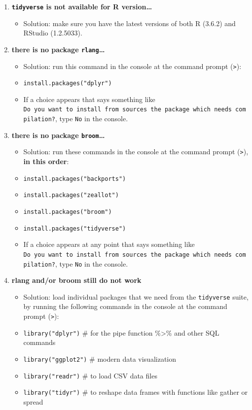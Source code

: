 \documentclass[
]{book}
\providecommand{\tightlist}{%
  \setlength{\itemsep}{0pt}\setlength{\parskip}{0pt}}
\begin{document}
\begin{enumerate}
\def\labelenumi{\arabic{enumi}.}
\tightlist
\item
  \textbf{\texttt{tidyverse} is not available for R version\ldots{}}

  \begin{itemize}
  \tightlist
  \item
    Solution: make sure you have the latest versions of both R (3.6.2) and RStudio (1.2.5033).
  \end{itemize}
\item
  \textbf{there is no package \texttt{rlang}\ldots{}}

  \begin{itemize}
  \tightlist
  \item
    Solution: run this command in the console at the command prompt (\texttt{\textgreater{}}):
  \item
    \texttt{install.packages("dplyr")}
  \item
    If a choice appears that says something like \texttt{Do\ you\ want\ to\ install\ from\ sources\ the\ package\ which\ needs\ compilation?}, type \texttt{No} in the console.
  \end{itemize}
\item
  \textbf{there is no package \texttt{broom}\ldots{}}

  \begin{itemize}
  \tightlist
  \item
    Solution: run these commands in the console at the command prompt (\texttt{\textgreater{}}), \textbf{in this order}:
  \item
    \texttt{install.packages("backports")}
  \item
    \texttt{install.packages("zeallot")}
  \item
    \texttt{install.packages("broom")}
  \item
    \texttt{install.packages("tidyverse")}
  \item
    If a choice appears at any point that says something like \texttt{Do\ you\ want\ to\ install\ from\ sources\ the\ package\ which\ needs\ compilation?}, type \texttt{No} in the console.
  \end{itemize}
\item
  \textbf{rlang and/or broom still do not work}

  \begin{itemize}
  \tightlist
  \item
    Solution: load individual packages that we need from the \texttt{tidyverse} suite, by running the following commands in the console at the command prompt (\texttt{\textgreater{}}):
  \item
    \texttt{library("dplyr")} \# for the pipe function \%\textgreater\% and other SQL commands
  \item
    \texttt{library("ggplot2")} \# modern data visualization
  \item
    \texttt{library("readr")} \# to load CSV data files
  \item
    \texttt{library("tidyr")} \# to reshape data frames with functions like gather or spread
  \end{itemize}
\end{enumerate}
\end{document}
